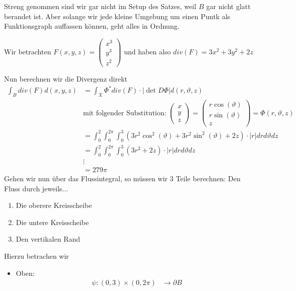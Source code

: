 \documentclass[main.tex]{subfiles}
\begin{document}
\begin{Beispiel}[$B = \{(x,y,z) \in \R^3 \mid x^2 + y^2 \leq 9 \land 0 \leq z \leq 2\}$ (ein Zylinder)]
  Streng genommen sind wir gar nicht im Setup des Satzes, weil $B$ gar nicht glatt berandet ist. Aber solange wir jede kleine Umgebung um einen Puntk als Funktionsgraph auffassen können, geht alles in Ordnung.

  Wir betrachten $F(x,y,z) = \begin{pmatrix}
    x^3 \\ y^3 \\ z^2
  \end{pmatrix}$ und haben also $div(F) = 3x^2 + 3y^2 + 2z$

  Nun berechnen wir die Divergenz direkt
  $$\begin{aligned}
    \int_B div(F) d(x,y,z) & = \int_{X} \Phi^* div(F) \cdot |\det D \Phi| d(r,\vartheta,z) \\
    & \text{mit folgender Substitution: } \begin{pmatrix}
      x \\ y \\ z
    \end{pmatrix} = \begin{pmatrix}
      r \cos(\vartheta) \\ r \sin(\vartheta) \\ z
    \end{pmatrix} = \Phi(r,\vartheta,z) \\
    & = \int_0^2 \int_0^{2\pi} \int_0^3 (3 r^2 \cos^2(\vartheta) + 3 r^2 \sin^2(\vartheta) + 2z )\cdot |r| dr d\vartheta dz \\
    & = \int_0^2 \int_0^{2\pi} \int_0^3 (3r^2 + 2z) \cdot |r| dr d\vartheta dz \\
    & \vdots \\
    & = 279 \pi
  \end{aligned}$$
  Gehen wir nun über das Flussintegral, so müssen wir 3 Teile berechnen: Den Fluss durch jeweils...
  \begin{enumerate}
    \item Die oberere Kreisscheibe
    \item Die untere Kreisscheibe
    \item Den vertikalen Rand
  \end{enumerate}
  Hierzu betrachen wir
  \begin{itemize}
    \item Oben:
      $$\begin{aligned}
        \psi: (0,3) \times (0,2 \pi) & \to \partial B \\

\end{aligned}$$
\end{itemize}
\end{Beispiel}
\end{document}
